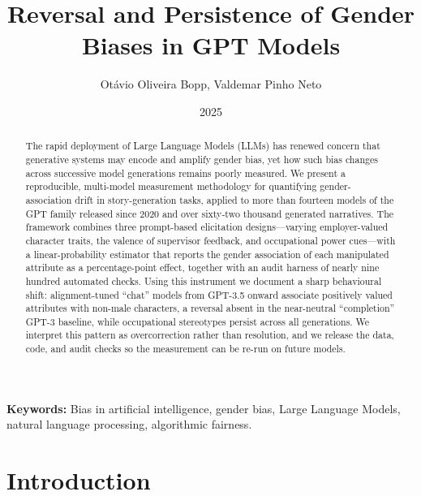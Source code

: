 \documentclass[jair,11pt,letterpaper]{article}
\title{Reversal and Persistence of Gender Biases in GPT Models}
\author{Otávio Oliveira Bopp, Valdemar Pinho Neto}
\date{2025}
\begin{document}
\maketitle


\begin{abstract}
The rapid deployment of Large Language Models (LLMs) has renewed concern that generative systems may encode and amplify gender bias, yet how such bias changes across successive model generations remains poorly measured. We present a reproducible, multi-model measurement methodology for quantifying gender-association drift in story-generation tasks, applied to more than fourteen models of the GPT family released since 2020 and over sixty-two thousand generated narratives. The framework combines three prompt-based elicitation designs---varying employer-valued character traits, the valence of supervisor feedback, and occupational power cues---with a linear-probability estimator that reports the gender association of each manipulated attribute as a percentage-point effect, together with an audit harness of nearly nine hundred automated checks. Using this instrument we document a sharp behavioural shift: alignment-tuned ``chat'' models from GPT-3.5 onward associate positively valued attributes with non-male characters, a reversal absent in the near-neutral ``completion'' GPT-3 baseline, while occupational stereotypes persist across all generations. We interpret this pattern as overcorrection rather than resolution, and we release the data, code, and audit checks so the measurement can be re-run on future models.
\end{abstract}

\medskip

\noindent\textbf{Keywords:} Bias in artificial intelligence, gender bias, Large Language Models, natural language processing, algorithmic fairness.

\newpage
\tableofcontents
\newpage

\section{Introduction}
\end{document}
